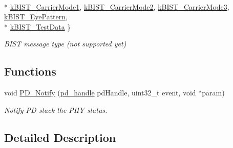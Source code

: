 \begin{DoxyCompactItemize}
\\*
\hyperlink{group__usb__pd__phy__drv_gga6e9f5312eacb47634a8cb7a9ef88ea2ea53186766d6c82165428fa63a874eb2e8}{k\-B\-I\-S\-T\-\_\-\-Carrier\-Mode1}, 
\hyperlink{group__usb__pd__phy__drv_gga6e9f5312eacb47634a8cb7a9ef88ea2ea376a9e89909ae22b43414d1feebda94b}{k\-B\-I\-S\-T\-\_\-\-Carrier\-Mode2}, 
\hyperlink{group__usb__pd__phy__drv_gga6e9f5312eacb47634a8cb7a9ef88ea2eab343b840951f1992144bf2a85181ba90}{k\-B\-I\-S\-T\-\_\-\-Carrier\-Mode3}, 
\hyperlink{group__usb__pd__phy__drv_gga6e9f5312eacb47634a8cb7a9ef88ea2eae2ef1b8c6d998a0a8a011962c53280e8}{k\-B\-I\-S\-T\-\_\-\-Eye\-Pattern}, 
\\*
\hyperlink{group__usb__pd__phy__drv_gga6e9f5312eacb47634a8cb7a9ef88ea2ea311a5b2f8176208f0d9fcc73e461a2d0}{k\-B\-I\-S\-T\-\_\-\-Test\-Data}
 \}
\begin{DoxyCompactList}\small\item\em B\-I\-S\-T message type (not supported yet) \end{DoxyCompactList}\end{DoxyCompactItemize}
\subsection*{Functions}
\begin{DoxyCompactItemize}
\item 
void \hyperlink{group__usb__pd__phy__drv_ga7f7f94758771b173653d27c508c8b33f}{P\-D\-\_\-\-Notify} (\hyperlink{group__usb__pd__stack_ga9397835347d48ef48b6b0ecba6312213}{pd\-\_\-handle} pd\-Handle, uint32\-\_\-t event, void $\ast$param)
\begin{DoxyCompactList}\small\item\em Notify P\-D stack the P\-H\-Y status. \end{DoxyCompactList}\end{DoxyCompactItemize}


\subsection{Detailed Description}


